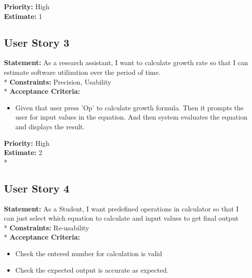 \documentclass[12pt]{article}
\begin{document}
\noindent \textbf {Priority: }High\\[0.4cm]
\newline
\noindent \textbf {Estimate:} 1\\[2cm]



\subsection{User Story 3} %
\noindent \textbf {Statement: }As a research assistant, I want to calculate growth rate so that I can estimate software utilization over the period of time. \\*
\newline 
\noindent \textbf {Constraints:} Precision, Usability\\*
\newline
\textbf{Acceptance Criteria: } 
\begin{itemize}
  \item Given that user press 'Op' to calculate  growth formula.
  \newline Then it prompts the user for input values in the equation.
  \newline And then system evaluates the equation and displays the result.\newline
\end{itemize}

\noindent \textbf {Priority:} High\\[0.4cm]
\newline
\noindent \textbf {Estimate:} 2\\*
\newline


\newpage
\subsection{User Story 4} %

\noindent \textbf {Statement: }As a Student, I want predefined operations in calculator so that I can just select which equation to calculate and input values to get final output \\*
\newline 
\noindent \textbf {Constraints:} Re-usability\\*
\newline
\textbf{Acceptance Criteria: } 
\begin{itemize}
  \item Check the entered number for calculation is valid
  \item Check the expected output is accurate as expected.
  
\end{itemize}
\end{document}
